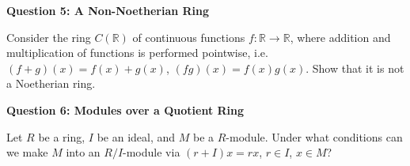 \documentclass[11pt,twoside, a4paper]{report}
\theoremstyle{plain}
\theoremstyle{definition}
\begin{document}
\begin{center}
{\bf Question 5: A Non-Noetherian Ring}
\end{center}

Consider the ring $C(\mathbb{R})$ of continuous functions $f:\mathbb{R}\to\mathbb{R}$, where addition and multiplication of functions is performed pointwise, i.e. $(f+g)(x) = f(x)+g(x)$, $(fg)(x)=f(x)g(x)$. Show that it is not a Noetherian ring.


\begin{center}
{\bf Question 6: Modules over a Quotient Ring}
\end{center}

Let $R$ be a ring, $I$ be an ideal, and $M$ be a $R$-module. Under what conditions can we make $M$ into an $R/I$-module via $(r+I)x = rx$, $r\in I$, $x\in M$?
\end{document}
